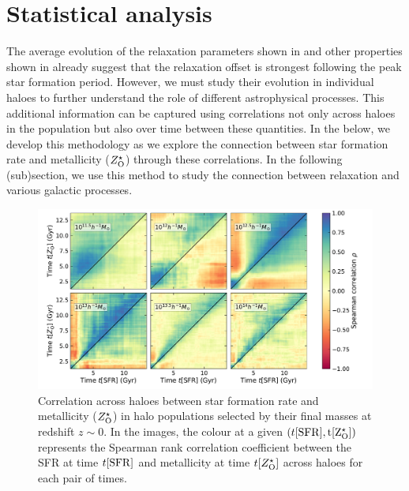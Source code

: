 \section{Statistical analysis}
\label{sec:methods-stat}
The average evolution of the relaxation parameters shown in  and other properties shown in  already suggest that the relaxation offset is strongest following the peak star formation period. However, we must study their evolution in individual haloes to further understand the role of different astrophysical processes. This additional information can be captured using correlations not only across haloes in the population but also over time between these quantities. In the  below, we develop this methodology as we explore the connection between star formation rate and metallicity ($Z^{\star}_{\rm{O}}$) through these correlations. In the following (sub)section, we use this method to study the connection between relaxation and various galactic processes. 

\begin{figure}[bhtp]
\centering
\includegraphics[width=\linewidth]{plots/dynam_relxn/Spea_correl_betw_SFR-Z(O)_SFreg.pdf}
\caption{Correlation across haloes between star formation rate and metallicity ($Z^{\star}_{\rm{O}}$) in halo populations selected by their final masses at redshift $z\sim 0$. In the images, the colour at a given $(t[\rm{SFR}],t[Z^{\star}_{\rm{O}}])$ represents the Spearman rank correlation coefficient between the SFR at time $t[\rm{SFR}]$ and metallicity at time $t[Z^{\star}_{\rm{O}}]$ across haloes for each pair of times.}
\label{fig:dynam-correl-sfr-ZOsfr-img}
\end{figure}

